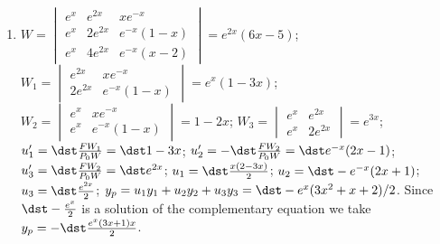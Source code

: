 \documentclass[openany]{book}
\newenvironment{sectionSolutions}{
 \begin{enumerate}[item-label={\thesection.\arabic{enumi}.}]
}{
 \end{enumerate}
}
\begin{document}
\begin{sectionSolutions}
The general solution is $y=-x(\ln x)^2+c_1x+c_2x^3+c_3x\ln x$,
so
\[
\begin{bmatrix}y\\y'\\y''
\end{bmatrix}=
\begin{bmatrix}
-x(\ln x)^2\\ -(\ln x)^2-2\ln x\\-\dst\frac{2\ln x}{ x}-\frac{2}{ x}
\end{bmatrix}+
\begin{bmatrix}
x&x^3&x\ln x\\1&3x^2&1+\ln x\\0&6x&\dst\frac{1}{ x}
\end{bmatrix}
\begin{bmatrix}
c_{1}\\ c_{2}\\ c_{3}
\end{bmatrix}
\]
Setting $x=1$ and imposing the initial conditions yields
\[
\threecol44{-2}=
\threecol00{-2}+\threebythree110131061\threecol{c_1}{c_2}{c_3}.
\]
Solving this system yields $c_1=3$, $c_2=1$, $c_3=-2$.
Therefore,$y=-x(\ln x)^2+3x+x^3-2x\ln x$.


\item
$W=\begin{vmatrix}
e^x&e^{2x}&xe^{-x}\\e^x&2e^{2x}&e^{-x}(1-x)\\e^x&4e^{2x}&e
^{-x}(x-2)\end{vmatrix}=e^{2x}(6x-5)$;
$W_1=\begin{vmatrix}
e^{2x}&xe^{-x}\\2e^{2x}&e^{-x}(1-x)\end{vmatrix}=e^x(1-3x)$;
$W_2=\begin{vmatrix}
e^x&xe^{-x}\\e^x&e^{-x}(1-x)\end{vmatrix}=1-2x$;
$W_3=\begin{vmatrix}
e^x&e^{2x}\\e^x&2e^{2x}\end{vmatrix}=e^{3x}$;
$u_1'=\dst\frac{FW_1}{ P_0W}=\dst1-3x$;
$u_2'=-\dst\frac{FW_2}{ P_0W}=\dst e^{-x}(2x-1)$;
$u_3'=\dst\frac{FW_2}{ P_0W}=\dst e^{2x}$;
$u_1=\dst\frac {x(2-3x)}{ 2}$;
$u_2=\dst -e^{-x}(2x+1)$;
$u_3=\dst\frac {e^{2x}}{ 2}$;
$y_p=u_1y_1+u_2y_2+u_3y_3=\dst-e^x(3x^2+x+2)/2$. Since
$\dst-\frac{e^x}{2}$ is a solution of the complementary equation
we take $y_p=-\dst\frac{e^x(3x+1)x}{2}$.


\end{sectionSolutions}
\end{document}

